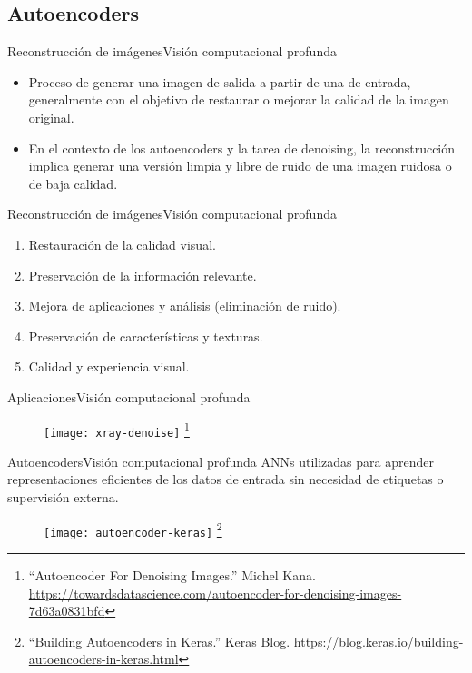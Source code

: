 \documentclass[10pt,border=3pt,tikz]{beamer}
\begin{document}
    \subsection{Autoencoders}
    \begin{frame}{Reconstrucción de imágenes}{Visión computacional profunda}
        \begin{itemize}
            \item Proceso de generar una imagen de salida a partir de una de entrada, generalmente con el objetivo de restaurar o mejorar la calidad de la imagen original.
            \item En el contexto de los autoencoders y la tarea de denoising, la reconstrucción implica generar una versión limpia y libre de ruido de una imagen ruidosa o de baja calidad.
        \end{itemize}
    \end{frame}
    
    \begin{frame}{Reconstrucción de imágenes}{Visión computacional profunda}
        \begin{enumerate}
            \item Restauración de la calidad visual.
            \item Preservación de la información relevante.
            \item Mejora de aplicaciones y análisis (eliminación de ruido).
            \item Preservación de características y texturas.
            \item Calidad y experiencia visual.
        \end{enumerate}
    \end{frame}
    
    \begin{frame}{Aplicaciones}{Visión computacional profunda}
        \begin{figure}
            \centering
            \texttt{[image: xray-denoise]}
            \let\thefootnote\relax\footnote{{\tiny “Autoencoder For Denoising Images.” Michel Kana. \url{https://towardsdatascience.com/autoencoder-for-denoising-images-7d63a0831bfd}}}
        \end{figure}
    \end{frame}
    
    \begin{frame}{Autoencoders}{Visión computacional profunda}
        ANNs utilizadas para aprender representaciones eficientes de los datos de entrada sin necesidad de etiquetas o supervisión externa.
        \begin{figure}
            \centering
            \texttt{[image: autoencoder-keras]}
            \let\thefootnote\relax\footnote{{\tiny “Building Autoencoders in Keras.” Keras Blog. \url{https://blog.keras.io/building-autoencoders-in-keras.html}}}
        \end{figure}
    \end{frame}
    
\end{document}
